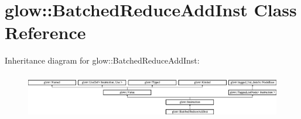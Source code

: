\hypertarget{classglow_1_1_batched_reduce_add_inst}{}\section{glow\+:\+:Batched\+Reduce\+Add\+Inst Class Reference}
\label{classglow_1_1_batched_reduce_add_inst}
Inheritance diagram for glow\+:\+:Batched\+Reduce\+Add\+Inst\+:\begin{figure}[H]
\begin{center}
\leavevmode
\includegraphics[height=1.991111cm]{classglow_1_1_batched_reduce_add_inst}
\end{center}
\end{figure}
